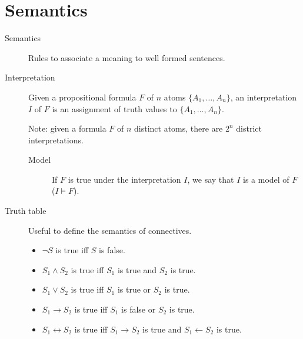 \section{Semantics}

\begin{description}
    \item[Semantics] 
        Rules to associate a meaning to well formed sentences.
\end{description}

\begin{description}
    \item[Interpretation] 
        Given a propositional formula $F$ of $n$ atoms $ \{ A_1, \dots, A_n \}$,
        an interpretation $I$ of $F$ is an assignment of truth values to $\{ A_1, \dots, A_n \}$.

        Note: given a formula $F$ of $n$ distinct atoms, there are $2^n$ district interpretations.

        \begin{description}
            \item[Model] 
                If $F$ is true under the interpretation $I$, 
                we say that $I$ is a model of $F$ ($I \models F$).
        \end{description}


    \item[Truth table] 
        Useful to define the semantics of connectives.
        \begin{itemize}
            \item $\lnot S$ is true iff $S$ is false.
            \item $S_1 \land S_2$ is true iff $S_1$ is true and $S_2$ is true.
            \item $S_1 \vee S_2$ is true iff $S_1$ is true or $S_2$ is true.
            \item $S_1 \rightarrow S_2$ is true iff $S_1$ is false or $S_2$ is true.
            \item $S_1 \leftrightarrow S_2$ is true iff $S_1 \rightarrow S_2$ is true and $S_1 \leftarrow S_2$ is true.
        \end{itemize}



\end{description}
